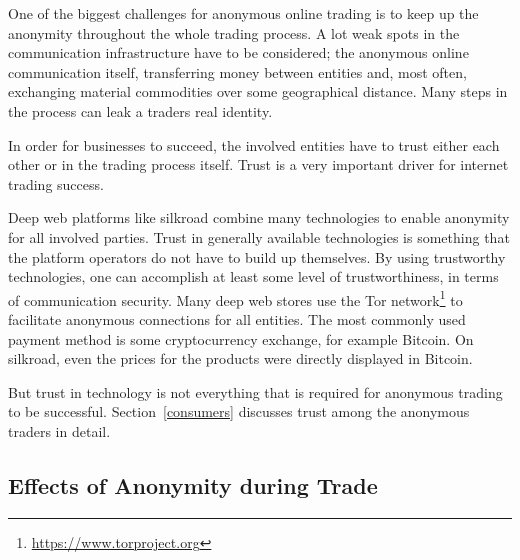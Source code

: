 One of the biggest challenges for anonymous online trading is to keep up the anonymity throughout the whole trading process. A lot weak spots in the communication infrastructure have to be considered; the anonymous online communication itself, transferring money between entities and, most often, exchanging material commodities over some geographical distance. Many steps in the process can leak a traders real identity.

In order for businesses to succeed, the involved entities have to trust either each other or in the trading process itself. Trust is a very important driver for internet trading success\cite{internetTrust2004}.

Deep web platforms like silkroad\cite{silkroad2013} combine many technologies to enable anonymity for all involved parties. Trust in generally available technologies is something that the platform operators do not have to build up themselves. By using trustworthy technologies, one can accomplish at least some level of trustworthiness, in terms of communication security. Many deep web stores use the Tor network\footnote{\url{https://www.torproject.org}} to facilitate anonymous connections for all entities\cite{silkroad2013}. The most commonly used payment method is some cryptocurrency exchange, for example Bitcoin. On silkroad, even the prices for the products were directly displayed in Bitcoin\cite{silkroad2013}.

But trust in technology is not everything that is required for anonymous trading to be successful. Section~\ref{consumers} discusses trust among the anonymous traders in detail.

\subsection{Effects of Anonymity during Trade}





